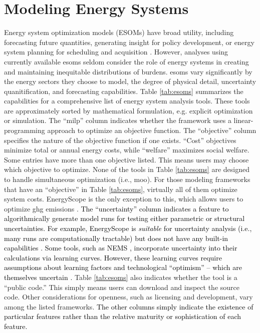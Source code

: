 \section{Modeling Energy Systems}
\label{section:esoms}

Energy system optimization models (ESOMs) have broad utility,
including forecasting future quantities, generating insight for policy
development, or energy system planning for scheduling and acquisition
\cite{decarolis_using_2011, yue_review_2018}. However, analyses using currently
available \acp{esom} seldom consider the role of energy systems in creating and
maintaining inequitable distributions of burdens. \acp{esom} vary significantly
by the energy sectors they choose to model, the degree of physical detail,
uncertainty quanitification, and forecasting capabilities. Table \ref{tab:esoms}
summarizes the capabilities for a comprehensive list of energy system analysis
tools. These tools are approximately sorted by mathematical formulation, e.g.
explicit optimization or simulation. The ``\ac{milp}'' column indicates whether
the framework uses a linear-programming approach to optimize an objective
function. The ``objective'' column specifies the nature of the objective
function if one exists. ``Cost'' objectives minimize total or annual energy
costs, while ``welfare'' maximizes social welfare. Some entries have more than
one objective listed. This means users may choose which objective to optimize.
None of the tools in Table \ref{tab:esoms} are designed to handle simultaneous
optimization (i.e., \ac{moo}). For those modeling frameworks that have an
``objective'' in Table \ref{tab:esoms}, virtually all of them optimize system
costs. EnergyScope is the only exception to this, which allows users to optimize
\ac{ghg} emissions \cite{limpens_energyscope_2019}. \textcolor{black}{The
``uncertainty'' column indicates a feature to algorithmically generate model
runs for testing either parametric or structural uncertainties.
\textcolor{black}{For example, EnergyScope is \textit{suitable} for uncertainty
analysis (i.e., many runs are computationally tractable) but does not have any
built-in capabilities \cite{limpens_energyscope_2019}.} Some tools, such as NEMS
\cite{nalley_national_2019}, incorporate uncertainty into their calculations via
learning curves. However, these learning curves require assumptions about
learning factors and technological ``optimism'' --  which are themselves
uncertain \cite{nalley_national_2019}.} Table \ref{tab:esoms} also indicates
whether the tool is a ``public code.'' This simply means users can download and
inspect the source code. Other considerations for openness, such as licensing
and development, vary among the listed frameworks. \textcolor{black}{The other
columns simply indicate the existence of particular features rather than the
relative maturity or sophistication of each feature.} 

